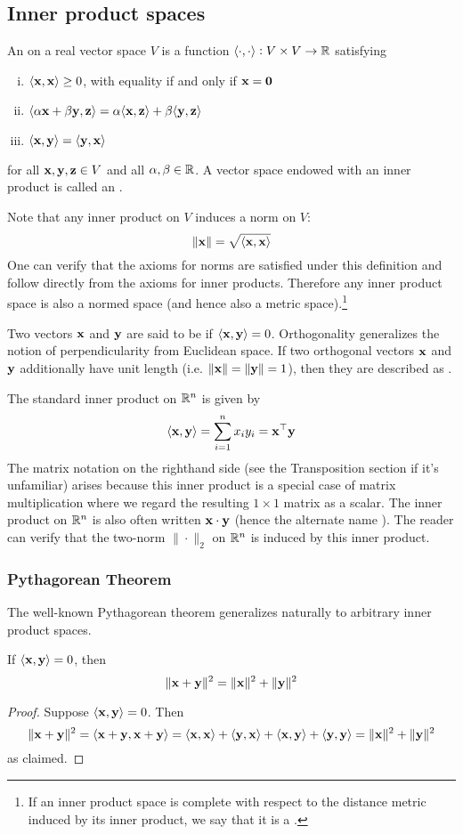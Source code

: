 \subsection{Inner product spaces}
An  on a real vector space $V$ is a function $\langle \cdot, \cdot \rangle : V \times V \to \mathbb{R}$ satisfying
\begin{enumerate}[(i)]
\item $\langle \mathbf{x}, \mathbf{x} \rangle \geq 0$, with equality if and only if $\mathbf{x} = \mathbf{0}$
\item $\langle \alpha\mathbf{x} + \beta\mathbf{y}, \mathbf{z} \rangle = \alpha\langle \mathbf{x}, \mathbf{z} \rangle + \beta\langle \mathbf{y}, \mathbf{z} \rangle$
\item $\langle \mathbf{x}, \mathbf{y} \rangle = \langle \mathbf{y}, \mathbf{x} \rangle$
\end{enumerate}
for all $\mathbf{x}, \mathbf{y}, \mathbf{z} \in V$ and all $\alpha,\beta \in \mathbb{R}$.
A vector space endowed with an inner product is called an .

Note that any inner product on $V$ induces a norm on $V$:
\[\|\mathbf{x}\| = \sqrt{\langle \mathbf{x}, \mathbf{x} \rangle}\]
One can verify that the axioms for norms are satisfied under this definition and follow directly from the axioms for inner products.
Therefore any inner product space is also a normed space (and hence also a metric space).\footnote{
    If an inner product space is complete with respect to the distance metric induced by its inner product, we say that it is a .
}

Two vectors $\mathbf{x}$ and $\mathbf{y}$ are said to be  if $\langle \mathbf{x}, \mathbf{y} \rangle = 0$.
Orthogonality generalizes the notion of perpendicularity from Euclidean space.
If two orthogonal vectors $\mathbf{x}$ and $\mathbf{y}$ additionally have unit length (i.e. $\|\mathbf{x}\| = \|\mathbf{y}\| = 1$), then they are described as .

The standard inner product on $\mathbb{R}^n$ is given by
\[\langle \mathbf{x}, \mathbf{y} \rangle = \sum_{i=1}^n x_iy_i = \mathbf{x}^\top\mathbf{y}\]
The matrix notation on the righthand side (see the Transposition section if it's unfamiliar) arises because this inner product is a special case of matrix multiplication where we regard the resulting $1 \times 1$ matrix as a scalar.
The inner product on $\mathbb{R}^n$ is also often written $\mathbf{x}\cdot\mathbf{y}$ (hence the alternate name ).
The reader can verify that the two-norm $\|\cdot\|_2$ on $\mathbb{R}^n$ is induced by this inner product.

\subsubsection{Pythagorean Theorem}
The well-known Pythagorean theorem generalizes naturally to arbitrary inner product spaces.
\begin{theorem}
If $\langle \mathbf{x}, \mathbf{y} \rangle = 0$, then
\[\|\mathbf{x}+\mathbf{y}\|^2 = \|\mathbf{x}\|^2 + \|\mathbf{y}\|^2\]
\end{theorem}
\begin{proof}
Suppose $\langle \mathbf{x}, \mathbf{y} \rangle = 0$. Then
\[\|\mathbf{x}+\mathbf{y}\|^2 = \langle \mathbf{x}+\mathbf{y}, \mathbf{x}+\mathbf{y} \rangle = \langle \mathbf{x}, \mathbf{x} \rangle + \langle \mathbf{y}, \mathbf{x} \rangle + \langle \mathbf{x}, \mathbf{y} \rangle + \langle \mathbf{y}, \mathbf{y} \rangle = \|\mathbf{x}\|^2 + \|\mathbf{y}\|^2\]
as claimed.
\end{proof}

